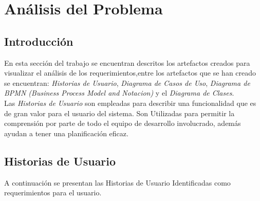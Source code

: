 \documentclass{report}
\begin{document}
\chapter{Análisis del Problema}

    \section{Introducción}
    En esta sección del trabajo se encuentran descritos los artefactos creados para visualizar el análisis de los requerimientos,entre los artefactos que se han creado se encuentran: \emph{Historias de Usuario}, \emph{Diagrama de Casos de Uso}, \emph{Diagrama de BPMN (Business Process Model and Notacion)} y el \emph{Diagrama de Clases}.\\ 
    Las \emph{Historias de Usuario} son empleadas para describir una funcionalidad que es de gran valor para el usuario del sistema. Son Utilizadas para permitir la comprensión por parte de todo el equipo de desarrollo involucrado, además ayudan  a tener una planificación eficaz.\\
    
    
    \section{Historias de Usuario}
    A continuación se presentan las Historias de Usuario Identificadas como requerimientos para el usuario.
    
    
    
\end{document}
